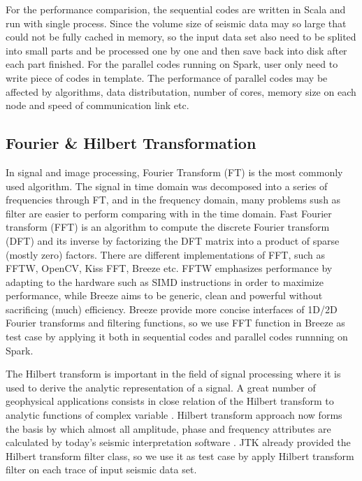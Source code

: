 For the performance comparision, the sequential codes are written in Scala and run with single process. Since the volume size of seismic data may so large that could not be fully cached in memory, so the input data set also need to be splited into small parts and be processed one by one and then save back into disk after each part finished. For the parallel codes running on Spark, user only need to write piece of codes in template. The performance of parallel codes may be affected by algorithms, data distributation, number of cores, memory size on each node and speed of communication link etc. 


\subsection{Fourier \& Hilbert Transformation}
In signal and image processing, Fourier Transform (FT) is the most commonly used algorithm. The signal in time domain was decomposed into a series of frequencies  through FT, and in the frequency domain, many problems sush as filter are easier to perform comparing with in the time domain. Fast Fourier transform (FFT) \cite{FFTWiki} is an algorithm to compute the discrete Fourier transform (DFT) and its inverse by factorizing the DFT matrix into a product of sparse (mostly zero) factors. There are different implementations of FFT, such as FFTW, OpenCV, Kiss FFT, Breeze etc. FFTW\cite{FFTW05} emphasizes performance by adapting to the hardware such as SIMD instructions in order to maximize performance, while Breeze aims to be generic, clean and powerful without sacrificing (much) efficiency. Breeze provide more concise interfaces of 1D/2D Fourier transforms and filtering functions, so we use FFT function in Breeze as test case by applying it both in sequential codes and parallel codes runnning on Spark.     

The Hilbert transform \cite{HilbertWiki} is important in the field of signal processing where it is used to derive the analytic representation of a signal. A great number of geophysical applications consists in close relation of the Hilbert transform to analytic functions of complex variable \cite{HilbertGeoApplication}. Hilbert transform approach now forms the basis by which almost all amplitude, phase and frequency attributes are calculated by today’s seismic interpretation software \cite{HilbertSeismic}. JTK already provided the Hilbert transform filter class, so we use it as test case by apply Hilbert transform filter on each trace of input seismic data set.

